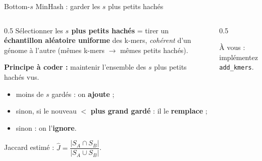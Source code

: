 \documentclass[aspectratio=169,11pt]{beamer}
\begin{document}
\begin{frame}{Bottom-$s$ MinHash : garder les $s$ plus petits hachés}
  \begin{columns}[T]
    \begin{column}{0.5\textwidth}
      \footnotesize
      Sélectionner les \textbf{$s$ plus petits hachés} = tirer un \textbf{échantillon
      aléatoire uniforme} des k-mers, \emph{cohérent} d'un génome à l'autre
      (mêmes k-mers $\to$ mêmes petits hachés).
      \medskip

      \textbf{Principe à coder :} maintenir l'ensemble des $s$ plus petits hachés vus.
      \begin{itemize}
        \item moins de $s$ gardés : on \textbf{ajoute} ;
        \item sinon, si le nouveau $<$ \textbf{plus grand gardé} : il le \textbf{remplace} ;
        \item sinon : on l'\textbf{ignore}.
      \end{itemize}
      \medskip
      Jaccard estimé : $\hat J = \dfrac{|S_A\cap S_B|}{|S_A\cup S_B|}$.
    \end{column}
    \begin{column}{0.5\textwidth}
      \centering

      \vspace{4pt}
      {\scriptsize\color{cGray} À vous : implémentez \texttt{add\_kmers}.}
    \end{column}
  \end{columns}
\end{frame}
\end{document}
